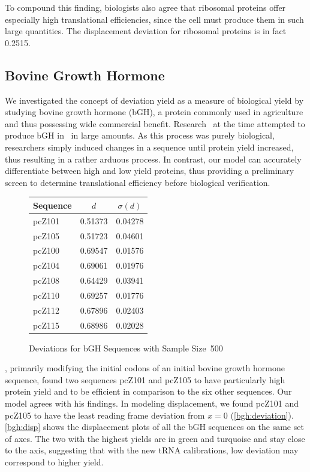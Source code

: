\documentclass[12pt]{article}
\numberwithin{equation}{section}
\begin{document}
To compound this finding, biologists also agree that ribosomal proteins
offer especially high translational efficiencies, since the cell must produce
them in such large quantities.  The displacement deviation for ribosomal
proteins is in fact 0.2515.

\subsection{Bovine Growth Hormone}
\label{section:bgh}

We investigated the concept of deviation yield as a measure of biological
yield by studying bovine growth hormone (bGH), a protein commonly used
in agriculture and thus possessing wide commercial benefit.
Research~\cite{schoner:bgh} at the time attempted to produce bGH
in \ecoli\ in large amounts.  As this process was purely biological, researchers
simply induced changes in a sequence until protein yield increased, thus resulting
in a rather arduous process. In contrast, our model can accurately
differentiate between high and low yield proteins, thus providing a preliminary screen
to determine translational efficiency before biological verification.

\begin{figure}
\centering
\begin{singlespace}
    \begin{tabular}{lcc}
        \toprule
        \textbf{Sequence} & $d$ & $\sigma(d)$\\
        \midrule
        pcZ101 & 0.51373 & 0.04278 \\
        pcZ105 & 0.51723 & 0.04601 \\
        \midrule
        pcZ100 & 0.69547 & 0.01576 \\
        pcZ104 & 0.69061 & 0.01976 \\
        pcZ108 & 0.64429 & 0.03941 \\
        pcZ110 & 0.69257 & 0.01776 \\
        pcZ112 & 0.67896 & 0.02403 \\
        pcZ115 & 0.68986 & 0.02028 \\
        \bottomrule
    \end{tabular}
    \caption{Deviations for bGH Sequences with Sample Size~500}
    \label{bgh:deviation}
\end{singlespace}
\end{figure}

\citet{schoner:bgh}, primarily modifying the initial codons of an initial
bovine growth hormone sequence, found two sequences pcZ101 and pcZ105
to have particularly high protein yield and to be efficient in
comparison to
the six other sequences. Our model agrees with his findings. In modeling displacement,
we found pcZ101 and pcZ105 to have the least reading frame deviation
from $x = 0$ (\autoref{bgh:deviation}). \autoref{bgh:disp} shows the displacement
plots of all the bGH sequences on the same set of axes.  The two with the highest yields
are in green and turquoise and stay close to the axis, suggesting that with the
new tRNA calibrations, low deviation may correspond to higher yield.
\end{document}
